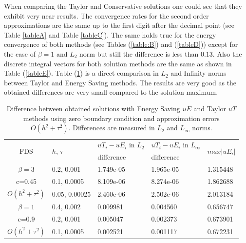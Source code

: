 \documentclass[%
 aip,
cp,  %
 amsmath,amssymb,%
 reprint,%
]{revtex4-2}
\newcommand{\rf}[1]{(\ref{#1})}
\begin{document}
When comparing the Taylor and Conservative solutions one could see that they exhibit very near results. The convergence rates for the second order approximations are the same up to the first digit after the decimal point (see Table \ref{tableA} and Table \ref{tableC}). The same holds true for the energy convergence of both methods (see Tables \rf{table:B} and  \rf{tableD}) except for the case of $\beta = 1$ and $L_2$ norm but still the difference is less than $0.13$. Also the discrete integral vectors for both solution methods are the same as shown in Table \rf{tableE}. Table \rf{tableF} is a direct comparison in $L_2$ and Infinity norms between Taylor and Energy Saving methods. The results are very good as the obtained differences are very small compared to the solution maximum.

\begin{table}[ht]
\centering
\small
		\begin{tabular}{||c|l|l|l|l||}
			\hline
			\hline
      \multirow{2  }{*}{FDS}        & \multirow{2  }{*}{$h$, $\tau$}  &   $uT_i - uE_i$  in $L_2$     &  $uT_i - uE_i$ in $L_\infty$ & \multirow{2  }{*}{$max|uE_i|$} \\
	                                        &                                                     &      difference                     &           difference                  &                                                       \\
   			\hline 
					\hline 
  $\beta=3$                   &0.2, 0.001         &  1.749e-05      &  1.965e-05  & 1.315448     \\
   c=0.45                        &0.1, 0.0005        &  8.109e-06       & 8.274e-06 &  1.862688     \\
     $O(h^2 + \tau^ 2)$ &0.05, 0.00025     & 2.460e-06         &2.502e-06  &   2.013184   \\
			\hline 
			\hline 
       $\beta=1$          &0.4, 0.002        & 0.009981     & 0.004560 & 0.656747   \\
                  c=0.9      &0.2, 0.001        & 0.005047      & 0.002373  & 0.673901   \\
  $O(h^2+ \tau^2)$ &0.1, 0.0005         & 0.002521      &0.001117 & 0.672231   \\
			\hline
	   \hline
			\hline 
		\end{tabular}
		\caption{Difference between obtained solutions with Energy Saving $uE$ and Taylor $uT$ methods using zero boundary condition and approximation errors $O(h^{2} + \tau^2 )$. Differences are measured in $L_2$ and $L_\infty$ norms.}
\label{tableF}
\end{table}
\end{document}
